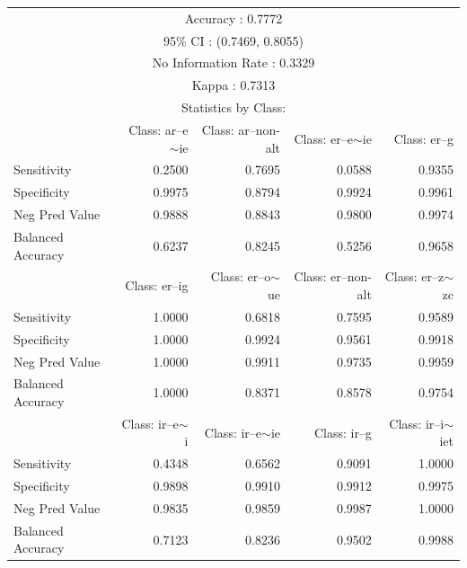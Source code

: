 \begin{table}[!htpb]
  \centering
  \scriptsize
  \begin{tabular}{lrrrr}
    \lsptoprule
    \multicolumn{5}{c}{Overall Statistics}                                     \\
    \midrule
    \multicolumn{5}{c}{Accuracy : 0.7772}\\
    \multicolumn{5}{c}{95\% CI : (0.7469, 0.8055)}\\
    \multicolumn{5}{c}{No Information Rate : 0.3329}\\
    \multicolumn{5}{c}{Kappa : 0.7313}\\
    \midrule
    \multicolumn{5}{c}{Statistics by Class:}                                   \\
    \midrule
 &    Class: ar--e$\sim$ie& Class: ar--non-alt& Class: er--e$\sim$ie &Class: er--g\\

    Sensitivity      &             0.2500&             0.7695&          0.0588 &      0.9355\\
    Specificity      &             0.9975&             0.8794&          0.9924 &      0.9961\\
    Neg Pred Value   &             0.9888&             0.8843&          0.9800 &      0.9974\\
    Balanced Accuracy&             0.6237&             0.8245&          0.5256 &      0.9658\\

 &   Class: er--ig &Class: er--o$\sim$ue& Class: er--non-alt &Class: er--z$\sim$zc\\

    Sensitivity        &          1.0000 &         0.6818&             0.7595 &         0.9589\\
    Specificity        &          1.0000 &         0.9924&             0.9561 &         0.9918\\
    Neg Pred Value     &          1.0000 &         0.9911&             0.9735 &         0.9959\\
    Balanced Accuracy  &          1.0000 &         0.8371&             0.8578 &         0.9754\\

 &    Class: ir--e$\sim$i &Class: ir--e$\sim$ie& Class: ir--g &Class: ir--i$\sim$iet\\

    Sensitivity       &            0.4348 &         0.6562&       0.9091 &          1.0000\\
    Specificity       &            0.9898 &         0.9910&       0.9912 &          0.9975\\
    Neg Pred Value    &            0.9835 &         0.9859&       0.9987 &          1.0000\\
    Balanced Accuracy &            0.7123 &         0.8236&       0.9502 &          0.9988\\


\end{tabular}
\end{table}
